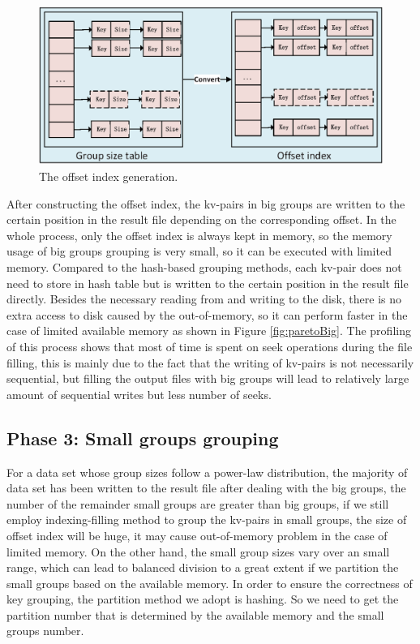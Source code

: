 \begin{figure}
\includegraphics[width=.48\textwidth]{fig/convert}
\caption{The offset index generation.}
\label{fig:convert}
\end{figure}



After constructing the offset index, the kv-pairs in big groups are written to the certain position in the result file depending on the corresponding offset. In the whole process, only the offset index is always kept in memory, so the memory usage of big groups grouping is very small, so it can be executed with limited memory. Compared to the hash-based grouping methods, each kv-pair does not need to store in hash table but is written to the certain position in the result file directly. Besides the necessary reading from and writing to the disk, there is no extra access to disk caused by the out-of-memory, so it can perform faster in the case of limited available memory as shown in Figure \ref{fig:paretoBig}. The profiling of this process shows that most of time is spent on seek operations during the file filling, this is mainly due to the fact that the writing of kv-pairs is not necessarily sequential, but filling the output files with big groups will lead to relatively large amount of sequential writes but less number of seeks.

\subsection{Phase 3: Small groups grouping}

For a data set whose group sizes follow a power-law distribution, the majority of data set has been written to the result file after dealing with the big groups, the number of the remainder small groups are greater than big groups, if we still employ indexing-filling method to group the kv-pairs in small groups, the size of offset index will be huge, it may cause out-of-memory problem in the case of limited memory. On the other hand, the small group sizes vary over an small range, which can lead to balanced division to a great extent if we partition the small groups based on the available memory. In order to ensure the correctness of key grouping, the partition method we adopt is hashing. So we need to get the partition number that is determined by the available memory and the small groups number.

